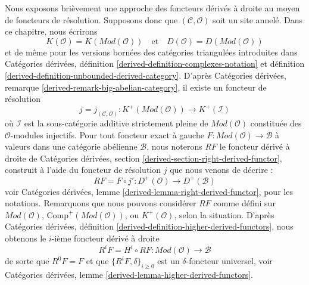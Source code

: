 \noindent
Nous exposons brièvement une approche des foncteurs dérivés à droite au moyen
de foncteurs de résolution. Supposons donc que $(\mathcal{C}, \mathcal{O})$ soit un site annelé.
Dans ce chapitre, nous écrirons
$$
K(\mathcal{O}) = K(\textit{Mod}(\mathcal{O}))
\quad
\text{et}
\quad
D(\mathcal{O}) = D(\textit{Mod}(\mathcal{O}))
$$
et de même pour les versions bornées des catégories triangulées
introduites dans
Catégories dérivées, définition \ref{derived-definition-complexes-notation} et
définition \ref{derived-definition-unbounded-derived-category}.
D'après
Catégories dérivées, remarque \ref{derived-remark-big-abelian-category},
il existe un foncteur de résolution
$$
j = j_{(\mathcal{C}, \mathcal{O})} :
K^{+}(\textit{Mod}(\mathcal{O}))
\longrightarrow
K^{+}(\mathcal{I})
$$
où $\mathcal{I}$ est la sous-catégorie additive strictement pleine de
$\textit{Mod}(\mathcal{O})$ constituée des $\mathcal{O}$-modules injectifs.
Pour tout foncteur exact à gauche $F : \textit{Mod}(\mathcal{O}) \to \mathcal{B}$
à valeurs dans une catégorie abélienne $\mathcal{B}$, nous noterons $RF$ le
foncteur dérivé à droite de
Catégories dérivées, section \ref{derived-section-right-derived-functor},
construit à l'aide du foncteur de résolution $j$ que nous venons de décrire :
\begin{equation}
\label{equation-RF}
RF = F \circ j' : D^{+}(\mathcal{O}) \longrightarrow D^{+}(\mathcal{B})
\end{equation}
voir
Catégories dérivées, lemme \ref{derived-lemma-right-derived-functor},
pour les notations. Remarquons que nous pouvons considérer $RF$ comme défini sur
$\textit{Mod}(\mathcal{O})$, $\text{Comp}^{+}(\textit{Mod}(\mathcal{O}))$, ou
$K^{+}(\mathcal{O})$, selon la situation. D'après
Catégories dérivées, définition \ref{derived-definition-higher-derived-functors},
nous obtenons le $i$-ième foncteur dérivé à droite
\begin{equation}
\label{equation-RFi}
R^iF = H^i \circ RF : \textit{Mod}(\mathcal{O}) \longrightarrow \mathcal{B}
\end{equation}
de sorte que $R^0F = F$ et que $\{R^iF, \delta\}_{i \geq 0}$ est un
$\delta$-foncteur universel, voir
Catégories dérivées, lemme \ref{derived-lemma-higher-derived-functors}.

